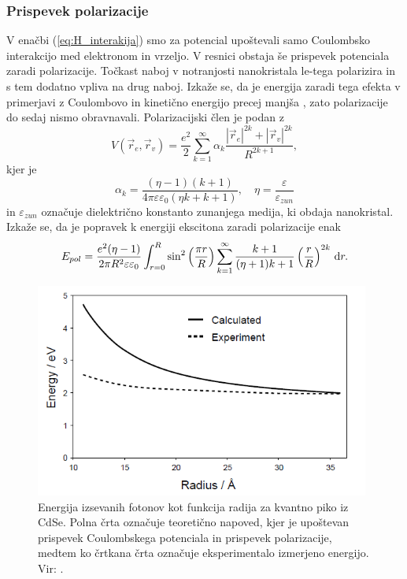 \documentclass[twoside,11pt]{article}
\newcommand{\dif}[1]{\,{\rm d}#1}
\begin{document}
\subsubsection{Prispevek polarizacije}
V enačbi (\ref{eq:H_interakija}) smo za potencial upoštevali samo Coulombsko interakcijo med elektronom in vrzeljo. V resnici obstaja še prispevek potenciala zaradi polarizacije. Točkast naboj
v notranjosti nanokristala le-tega polarizira in s tem dodatno vpliva na drug naboj. Izkaže se, da je energija zaradi tega efekta v primerjavi z Coulombovo in kinetično energijo
precej manjša \cite{doi:10.1021/ed079p1094}, zato polarizacije do sedaj nismo obravnavali. Polarizacijski člen je podan z
\begin{equation}
   V(\vec{r}_e, \vec{r}_v) = \frac{e^2}{2} \sum_{k=1}^{\infty} \alpha_k \frac{|\vec{r}_e|^{2k}+|\vec{r}_v|^{2k}}{R^{2k+1}},
\end{equation}
kjer je
\begin{equation}
   \alpha_k = \frac{(\eta-1)(k+1)}{4\pi \varepsilon \varepsilon_0 (\eta k + k + 1)}, \quad \eta=\frac{\varepsilon}{\varepsilon_{zun}}
\end{equation}
in $\varepsilon_{zun}$ označuje dielektrično konstanto zunanjega medija, ki obdaja nanokristal. Izkaže se, da je popravek k energiji ekscitona zaradi polarizacije enak \cite{doi:10.1021/ed079p1094}
\begin{equation}
   E_{pol} = \frac{e^2(\eta - 1)}{2\pi R^2 \varepsilon \varepsilon_0} \int_{r=0}^{R} \sin^2 \left(\frac{\pi r}{R}\right) \sum_{k=1}^{\infty} \frac{k+1}{(\eta + 1)k + 1} \left(\frac{r}{R}\right)^{2k} \dif{r}.
\end{equation}

\begin{figure}
   \begin{center}
       \includegraphics[width=11cm]{figures/energija_funkcija_radija.png}
       \caption{Energija izsevanih fotonov kot funkcija radija za kvantno piko iz CdSe. Polna črta označuje teoretično napoved, kjer je upoštevan prispevek Coulombskega potenciala in prispevek polarizacije, medtem ko črtkana črta označuje eksperimentalo izmerjeno energijo. Vir: \cite{doi:10.1021/ed079p1094}.}
       \label{fig:energija_funkcija_radija}
   \end{center}
\end{figure}
\end{document}
